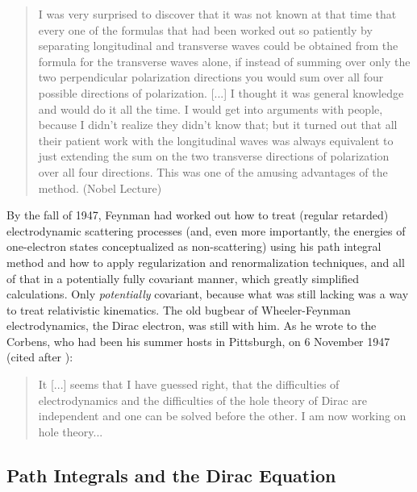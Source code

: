 \documentclass[12pt,a4paper]{article}
\begin{document}
\begin{quote}
I was very surprised to discover that it was not known at that time that every one of the formulas that had been worked out so patiently by separating longitudinal and transverse waves could be obtained from the formula for the transverse waves alone, if instead of summing over only the two perpendicular polarization directions you would sum over all four possible directions of polarization. [...] I thought it was general knowledge and would do it all the time. I would get into arguments with people, because I didn't realize they didn't know that; but it turned out that all their patient work with the longitudinal waves was always equivalent to just extending the sum on the two transverse directions of polarization over all four directions. This was one of the amusing advantages of the method. (Nobel Lecture)
\end{quote}

By the fall of 1947, Feynman had worked out how to treat (regular retarded) electrodynamic scattering processes (and, even more importantly, the energies of one-electron states conceptualized as non-scattering) using his path integral method and how to apply regularization and renormalization techniques, and all of that in a potentially fully covariant manner, which greatly simplified calculations. Only \emph{potentially} covariant, because what was still lacking was a way to treat relativistic kinematics. The old bugbear of Wheeler-Feynman electrodynamics, the Dirac electron, was still with him. As he wrote to the Corbens, who had been his summer hosts in Pittsburgh, on 6 November 1947 (cited after \citep[p. 423]{schweber_1994_qed}):

\begin{quote}
It [...] seems that I have guessed right, that the difficulties of electrodynamics and the difficulties of the hole theory of Dirac are independent and one can be solved before the other. I am now working on hole theory...
\end{quote}

\subsection{Path Integrals and the Dirac Equation}
\end{document}
